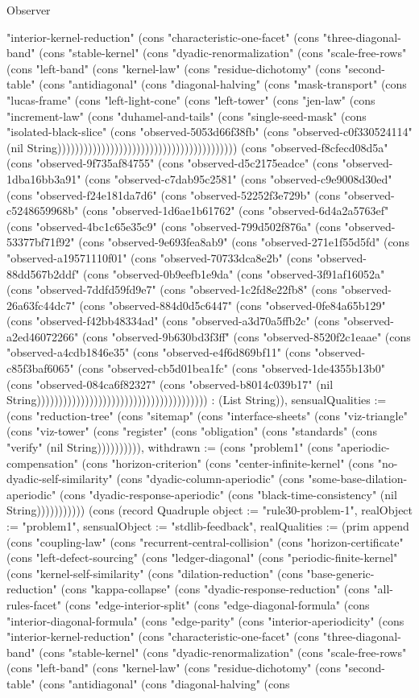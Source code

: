 \begin{lexlean}{Observer}
\begin{semanticmodule}
{"interior-kernel-reduction" (cons "characteristic-one-facet" (cons "three-diagonal-band" (cons "stable-kernel" (cons "dyadic-renormalization" (cons "scale-free-rows" (cons "left-band" (cons "kernel-law" (cons "residue-dichotomy" (cons "second-table" (cons "antidiagonal" (cons "diagonal-halving" (cons "mask-transport" (cons "lucas-frame" (cons "left-light-cone" (cons "left-tower" (cons "jen-law" (cons "increment-law" (cons "duhamel-and-tails" (cons "single-seed-mask" (cons "isolated-black-slice" (cons "observed-5053d66f38fb" (cons "observed-c0f330524114" (nil String))))))))))))))))))))))))))))))))))))))))) (cons "observed-f8cfecd08d5a" (cons "observed-9f735af84755" (cons "observed-d5c2175eadce" (cons "observed-1dba16bb3a91" (cons "observed-c7dab95c2581" (cons "observed-c9e9008d30ed" (cons "observed-f24e181da7d6" (cons "observed-52252f3e729b" (cons "observed-c5248659968b" (cons "observed-1d6ae1b61762" (cons "observed-6d4a2a5763ef" (cons "observed-4bc1c65e35c9" (cons "observed-799d502f876a" (cons "observed-53377bf71f92" (cons "observed-9e693fea8ab9" (cons "observed-271e1f55d5fd" (cons "observed-a19571110f01" (cons "observed-70733dca8e2b" (cons "observed-88dd567b2ddf" (cons "observed-0b9eefb1e9da" (cons "observed-3f91af16052a" (cons "observed-7ddfd59fd9e7" (cons "observed-1c2fd8e22fb8" (cons "observed-26a63fc44dc7" (cons "observed-884d0d5c6447" (cons "observed-0fe84a65b129" (cons "observed-f42bb48334ad" (cons "observed-a3d70a5ffb2c" (cons "observed-a2ed46072266" (cons "observed-9b630bd3f3ff" (cons "observed-8520f2c1eaae" (cons "observed-a4cdb1846e35" (cons "observed-e4f6d869bf11" (cons "observed-c85f3baf6065" (cons "observed-cb5d01bea1fc" (cons "observed-1de4355b13b0" (cons "observed-084ca6f82327" (cons "observed-b8014c039b17" (nil String))))))))))))))))))))))))))))))))))))))) : (List String)), sensualQualities := (cons "reduction-tree" (cons "sitemap" (cons "interface-sheets" (cons "viz-triangle" (cons "viz-tower" (cons "register" (cons "obligation" (cons "standards" (cons "verify" (nil String)))))))))), withdrawn := (cons "problem1" (cons "aperiodic-compensation" (cons "horizon-criterion" (cons "center-infinite-kernel" (cons "no-dyadic-self-similarity" (cons "dyadic-column-aperiodic" (cons "some-base-dilation-aperiodic" (cons "dyadic-response-aperiodic" (cons "black-time-consistency" (nil String))))))))))}) (cons (record Quadruple {object := "rule30-problem-1", realObject := "problem1", sensualObject := "stdlib-feedback", realQualities := (prim append (cons "coupling-law" (cons "recurrent-central-collision" (cons "horizon-certificate" (cons "left-defect-sourcing" (cons "ledger-diagonal" (cons "periodic-finite-kernel" (cons "kernel-self-similarity" (cons "dilation-reduction" (cons "base-generic-reduction" (cons "kappa-collapse" (cons "dyadic-response-reduction" (cons "all-rules-facet" (cons "edge-interior-split" (cons "edge-diagonal-formula" (cons "interior-diagonal-formula" (cons "edge-parity" (cons "interior-aperiodicity" (cons "interior-kernel-reduction" (cons "characteristic-one-facet" (cons "three-diagonal-band" (cons "stable-kernel" (cons "dyadic-renormalization" (cons "scale-free-rows" (cons "left-band" (cons "kernel-law" (cons "residue-dichotomy" (cons "second-table" (cons "antidiagonal" (cons "diagonal-halving" (cons }
\end{semanticmodule}
\end{lexlean}

